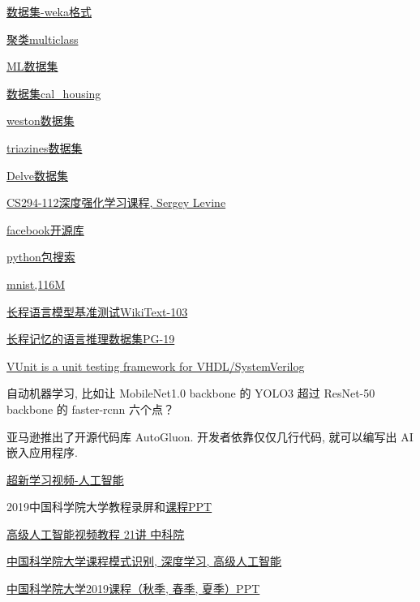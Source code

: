 \href{http://www.cs.waikato.ac.nz/ml/weka/datasets.html}{数据集-weka格式}

\href{http://www.csie.ntu.edu.tw/~cjlin/libsvmtools/datasets/multiclass.html}{聚类multiclass}

\href{http://archive.ics.uci.edu//ml/datasets}{ML数据集}

\href{http://www.dcc.fc.up.pt/ltorgo/Regression/cal_housing.html}{数据集cal\_housing}

\href{http://leon.bottou.org/papers/bordes-ertekin-weston-bottou-2005}{weston数据集}

\href{http://mldata.org/repository/data/viewslug/regression-datasets-triazines/}{triazines数据集}

\href{http://www.cs.toronto.edu/~delve/data/datasets.html}{Delve数据集}

\href{http://rail.eecs.berkeley.edu/deeprlcourse/}{CS294-112深度强化学习课程, Sergey Levine}

\href{https://github.com/facebookresearch}{facebook开源库}

\href{https://github.com/}{python包搜索}

\href{http://yann.lecun.com/exdb/mnist/t10k-images-idx3-ubyte.gz}{mnist,116M}

\href{http://academictorrents.com/details/a4fee5547056c845e31ab952598f43b42333183c}{长程语言模型基准测试WikiText-103}

\href{https://console.cloud.google.com/storage/browser/deepmind-gutenberg}{长程记忆的语言推理数据集PG-19} \cite{raecompressive2019}

\href{http://vunit.github.io/}{VUnit is a unit testing framework for VHDL/SystemVerilog}

自动机器学习, 比如让 MobileNet1.0 backbone 的 YOLO3 超过 ResNet-50 backbone 的 faster-rcnn 六个点？

亚马逊推出了开源代码库 AutoGluon. 开发者依靠仅仅几行代码, 就可以编写出 AI 嵌入应用程序.

\href{https://www.bilibili.com/video/av33395309/}{超新学习视频-人工智能}

2019中国科学院大学教程录屏和\href{https://github.com/HuangCongQing/UCAS_Course_2019}{课程PPT}

\href{https://www.iqiyi.com/v_19rr1o847g.html#curid=1148884000_8c04c5033512842cb378be129ace634e}{高级人工智能视频教程 21讲 中科院}

\href{https://github.com/univeryinli/ucas-ppt}{中国科学院大学课程模式识别, 深度学习, 高级人工智能}

\href{https://github.com/zggl/UCAS_Course_2019}{中国科学院大学2019课程（秋季, 春季, 夏季）PPT}


